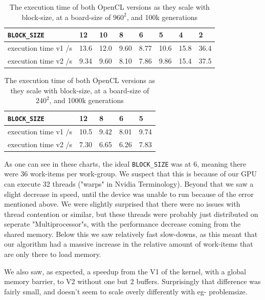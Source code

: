 \documentclass[a4paper,english,12pt,twoside=false]{scrartcl} %
\begin{document}
\begin{table}[]
\centering
\begin{tabular}{l||l|l|l|l|l|l|l}
    \verb|BLOCK_SIZE|    & 12   & 10   & 8    & 6    & 5    & 4    & 2    \\ \hline \hline
    execution time v1 /s & 13.6 & 12.0 & 9.60 & 8.77 & 10.6 & 15.8 & 36.4 \\ \hline
    execution time v2 /s & 9.34 & 9.60 & 8.10 & 7.86 & 9.86 & 15.4 & 37.5 \\
\end{tabular}
\caption{The execution time of both OpenCL versions as they scale with block-size, at a board-size of $960^2$, and 100k generations}
\label{tab:blocksize-scaling1}
\end{table}

\begin{table}[]
\centering
\begin{tabular}{l||l|l|l|l}
    \verb|BLOCK_SIZE|    & 12   & 8    & 6    & 5    \\ \hline \hline
    execution time v1 /s & 10.5 & 9.42 & 8.01 & 9.74 \\ \hline
    execution time v2 /s & 7.30 & 6.65 & 6.26 & 7.83 \\
\end{tabular}
\caption{The execution time of both OpenCL versions as they scale with block-size, at a board-size of $240^2$, and 1000k generations}
\label{tab:blocksize-scaling2}
\end{table}

As one can see in these charts, the ideal \verb|BLOCK_SIZE| was at 6, meaning there were 36 work-items per work-group.
We suspect that this is because of our GPU can execute 32 threads ("warps" in Nvidia Terminology).
Beyond that we saw a slight decrease in speed, until the device was unable to run because of the error mentioned above.
We were slightly surprised that there were no issues with thread contention or similar, but these threads were probably just distributed on seperate "Multiprocessor"s, with the performance decrease coming from the shared memory.
Below this we saw relatively fast slow-downs, as this meant that our algorithm had a massive increase in the relative amount of work-items that are only there to load memory.

We also saw, as expected, a speedup from the V1 of the kernel, with a global memory barrier, to V2 without one but 2 buffers. Surprisingly that difference was fairly small, and doesn't seem to scale overly differently with eg- problemsize.
\end{document}
